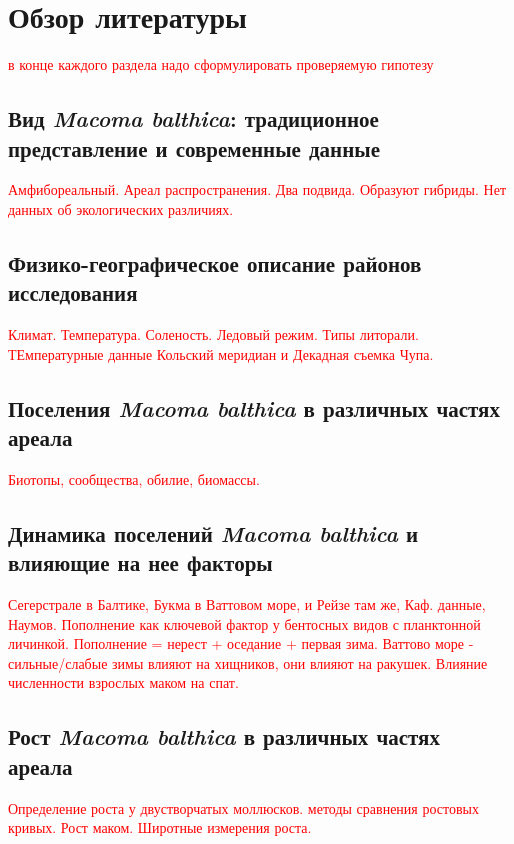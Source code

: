	\section{Обзор литературы}
\textcolor{red}{в конце каждого раздела надо сформулировать проверяемую гипотезу}
		\subsection{Вид {\it Macoma balthica}: традиционное представление и современные данные}
\textcolor{red}{Амфибореальный. Ареал распространения. Два подвида. Образуют гибриды. Нет данных об экологических различиях.}

		\subsection{Физико-географическое описание районов исследования}
\textcolor{red}{Климат. Температура. Соленость. Ледовый режим. Типы литорали.
ТЕмпературные данные Кольский меридиан и Декадная съемка Чупа.}

		\subsection{Поселения {\it Macoma balthica} в различных частях ареала}
\textcolor{red}{Биотопы, сообщества, обилие, биомассы.}

		\subsection{Динамика поселений {\it Macoma balthica} и влияющие на нее факторы}
\textcolor{red}{Сегерстрале в Балтике, Букма в Ваттовом море, и Рейзе там же, Каф. данные, Наумов.
Пополнение как ключевой фактор у бентосных видов с планктонной личинкой. 
Пополнение = нерест + оседание + первая зима.
Ваттово море - сильные/слабые зимы влияют на хищников, они влияют на ракушек. 
Влияние численности взрослых маком на спат.}

		\subsection{Рост {\it Macoma balthica} в различных частях ареала}
\textcolor{red}{Определение роста у двустворчатых моллюсков. 
методы сравнения ростовых кривых. 
Рост маком. 
Широтные измерения роста.}

